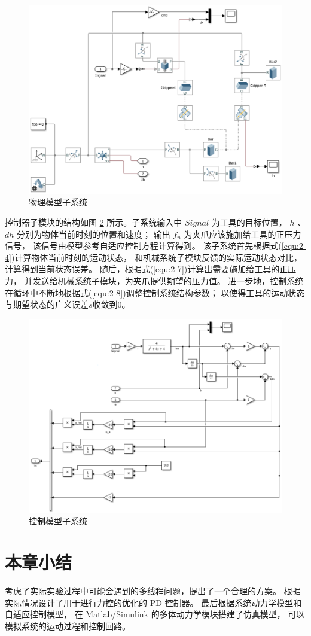 \begin{figure}[!ht]
  \centering
  \includegraphics[scale=0.6]{chapter03/pic/3-5}
  \caption{物理模型子系统}
  \label{fig:3-5}
  \vspace{-0.3cm}
\end{figure}

控制器子模块的结构如图 \ref{fig:3-6} 所示。子系统输入中 $Signal$ 为工具的目标位置，
$h$ 、$dh$ 分别为物体当前时刻的位置和速度；
输出 $f_n$ 为夹爪应该施加给工具的正压力信号，
该信号由模型参考自适应控制方程计算得到。
该子系统首先根据式(\ref{equ:2-4})计算物体当前时刻的运动状态，
和机械系统子模块反馈的实际运动状态对比，计算得到当前状态误差。
随后，根据式(\ref{equ:2-7})计算出需要施加给工具的正压力，
并发送给机械系统子模块，为夹爪提供期望的压力值。
进一步地，控制系统在循环中不断地根据式(\ref{equ:2-8})调整控制系统结构参数；
以使得工具的运动状态与期望状态的广义误差$s$收敛到0。

\begin{figure}[!ht]
  \centering
  \includegraphics[scale=0.6]{chapter03/pic/3-6}
  \caption{控制模型子系统}
  \label{fig:3-6}
  \vspace{-0.3cm}
\end{figure}

\section{本章小结}
考虑了实际实验过程中可能会遇到的多线程问题，提出了一个合理的方案。
根据实际情况设计了用于进行力控的优化的 PD 控制器。
最后根据系统动力学模型和自适应控制模型，
在 Matlab/Simulink 的多体动力学模块搭建了仿真模型，
可以模拟系统的运动过程和控制回路。

